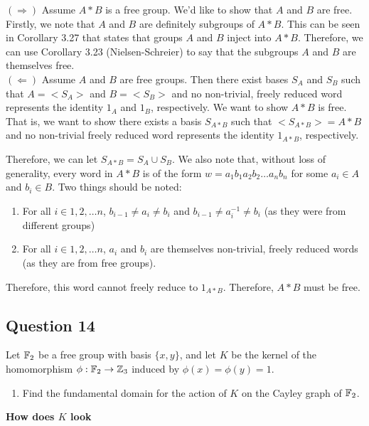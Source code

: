 $(\Rightarrow)$ Assume $A*B$ is a free group. We'd like to show that $A$ and $B$ are free. Firstly, we note that $A$ and $B$ are definitely subgroups of $A*B$. This can be seen in Corollary 3.27 that states that groups $A$ and $B$ inject into $A*B$. Therefore, we can use Corollary 3.23 (Nielsen-Schreier) to say that the subgroups $A$ and $B$ are themselves free.\\

$(\Leftarrow)$ Assume $A$ and $B$ are free groups. Then there exist bases $S_A$ and $S_B$ such that $A=<S_A>$ and $B=<S_B>$ and no non-trivial, freely reduced word represents the identity $1_A$ and $1_B$, respectively. We want to show $A*B$ is free. That is, we want to show there exists a basis $S_{A*B}$ such that $<S_{A*B}>=A*B$ and no non-trivial freely reduced word represents the identity $1_{A*B}$, respectively.

Therefore, we can let $S_{A*B}=S_A \cup S_B$. We also note that, without loss of generality, every word in $A*B$ is of the form $w=a_{1}b_{1}a_{2}b_{2}\ldots a_{n}b_{n}$ for some $a_i\in A$ and $b_i\in B$. Two things should be noted: 

\begin{enumerate}
\item For all $i\in {1, 2, \ldots n}$, $b_{i-1} \neq a_i \neq b_i$ and $b_{i-1} \neq a_i^{-1} \neq b_i$ (as they were from different groups)
\item For all $i\in {1, 2, \ldots n}$, $a_i$ and $b_i$ are themselves non-trivial, freely reduced words (as they are from free groups).
\end{enumerate}

Therefore, this word cannot freely reduce to $1_{A*B}$. Therefore, $A*B$ must be free.
\subsection*{Question 14}

Let $\mathbb{F}_2$ be a free group with basis $\{x,y\}$, and let $K$
 be the kernel of the homomorphism $\phi:\mathbb{F}_2\rightarrow \mathbb{Z}_3$ induced by $\phi(x)=\phi(y)=1$.

\renewcommand{\labelenumi}{\alph{enumi}}
\begin{enumerate}
  \item Find the fundamental domain for the action of $K$ on the Cayley graph of $\mathbb{F}_2$.
\end{enumerate}

\textbf{How does $K$ look}

